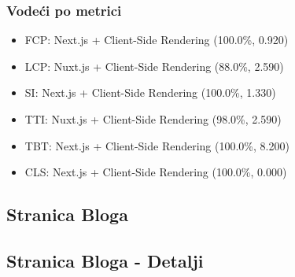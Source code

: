 \subsubsection{Vodeći po metrici}
\begin{itemize}
    \item FCP: Next.js + Client-Side Rendering (100.0\%, 0.920)
    \item LCP: Nuxt.js + Client-Side Rendering (88.0\%, 2.590)
    \item SI: Next.js + Client-Side Rendering (100.0\%, 1.330)
    \item TTI: Nuxt.js + Client-Side Rendering (98.0\%, 2.590)
    \item TBT: Next.js + Client-Side Rendering (100.0\%, 8.200)
    \item CLS: Next.js + Client-Side Rendering (100.0\%, 0.000)
\end{itemize}

\subsection{Stranica Bloga}
\subsection{Stranica Bloga - Detalji}


